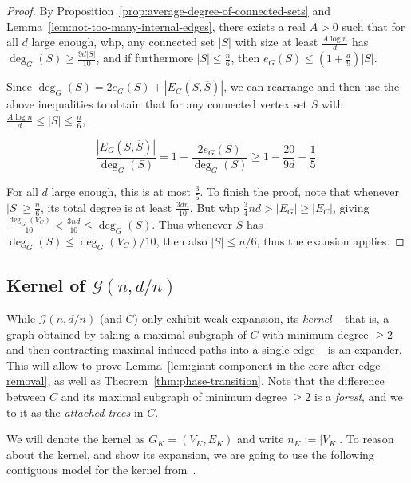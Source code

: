 \documentclass[11pt]{article}
\theoremstyle{plain}
\newcommand{\G}{\mathcal{G}}
\newcommand{\1}{\mathbb{1}}
\begin{document}
\weakexpansion*
\begin{proof}
    By Proposition~\ref{prop:average-degree-of-connected-sets} and Lemma~\ref{lem:not-too-many-internal-edges}, there exists a real \(A>0\) such that for all \(d\) large enough, whp, any connected set \(|S|\) with size at least \(\frac{A\log n}{d}\) has \(\deg_G(S) \geq \tfrac{9d|S|}{10}\), and if furthermore \(|S|\leq\tfrac n6\), then \(e_G(S)\leq (1+\tfrac d9)|S|\).

    Since \(\deg_G(S) = 2e_G(S) + |E_G(S,\overline S)|\), we can rearrange and then use the above inequalities to obtain that for any connected vertex set \(S\) with \(\frac{A\log n}{d}\leq |S|\leq \tfrac n6\),

    \[
    \frac{|E_G(S,\overline S)|}{\deg_G(S)} = 1 - \frac{2e_G(S)}{\deg_G(S)} \geq 1 - \frac{20}{9d} - \frac{1}{5}.
    \]

    For all \(d\) large enough, this is at most \(\tfrac{3}{5}\). To finish the proof, note that whenever \(|S|\geq \tfrac n6\), its total degree is at least \(\frac{3dn}{10}\). But whp \(\tfrac 34 nd > |E_G|\geq |E_C|\), giving \(\frac{\deg_G(V_C)}{10} < \frac{3nd}{10}\leq \deg_G(S)\). Thus whenever \(S\) has \(\deg_G(S)\leq \deg_G(V_C)/10\), then also \(|S|\leq n/6\), thus the exansion applies.
\end{proof}


\subsection{Kernel of \(\G(n,d/n)\)}

While \(\G(n,d/n)\) (and \(C\)) only exhibit weak expansion, its \textit{kernel} -- that is, a graph obtained by taking a maximal subgraph of \(C\) with minimum degree \(\geq 2\) and then contracting maximal induced paths into a single edge -- is an expander. This will allow to prove Lemma~\ref{lem:giant-component-in-the-core-after-edge-removal}, as well as Theorem~\ref{thm:phase-transition}. Note that the difference between \(C\) and its maximal subgraph of minimum degree \(\geq 2\) is a \textit{forest}, and we to it as the \textit{attached trees} in \(C\).

We will denote the kernel as \(G_K = (V_K,E_K)\) and write \(n_K := |V_K|\). To reason about the kernel, and show its expansion, we are going to use the following contiguous model for the kernel from~\cite{anatomy-of-giant}.
\end{document}
